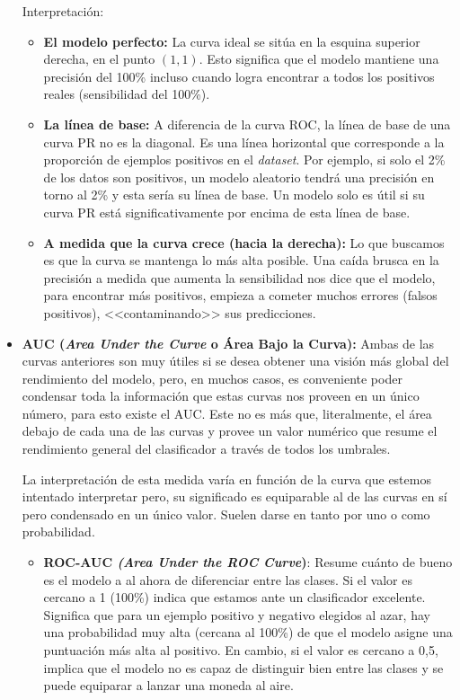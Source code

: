 \begin{itemize}
	Interpretación:
	
	\begin{itemize}
		\item \textbf{El modelo perfecto:} La curva ideal se sitúa en la esquina superior derecha, en el punto $(1, 1)$. Esto significa que el modelo mantiene una precisión del 100\% incluso cuando logra encontrar a todos los positivos reales (sensibilidad del 100\%).
		
		\item \textbf{La línea de base:} A diferencia de la curva ROC, la línea de base de una curva PR no es la diagonal. Es una línea horizontal que corresponde a la proporción de ejemplos positivos en el \textit{dataset}. Por ejemplo, si solo el 2\% de los datos son positivos, un modelo aleatorio tendrá una precisión en torno al 2\% y esta sería su línea de base. Un modelo solo es útil si su curva PR está significativamente por encima de esta línea de base.
		
		\item \textbf{A medida que la curva crece (hacia la derecha):} Lo que buscamos es que la curva se mantenga lo más alta posible. Una caída brusca en la precisión a medida que aumenta la sensibilidad nos dice que el modelo, para encontrar más positivos, empieza a cometer muchos errores (falsos positivos), <<contaminando>> sus predicciones.
	\end{itemize}
	
	\item \textbf{AUC (\textit{Area Under the Curve} o Área Bajo la Curva):} Ambas de las curvas anteriores son muy útiles si se desea obtener una visión más global del rendimiento del modelo, pero, en muchos casos, es conveniente poder condensar toda la información que estas curvas nos proveen en un único número, para esto existe el AUC. Este no es más que, literalmente, el área debajo de cada una de las curvas y provee un valor numérico que resume el rendimiento general del clasificador a través de todos los umbrales.
	
	La interpretación de esta medida varía en función de la curva que estemos intentado interpretar pero, su significado es equiparable al de las curvas en sí pero condensado en un único valor. Suelen darse en tanto por uno o como probabilidad.
	
	\begin{itemize}
		\item \textbf{ROC-AUC \textit{(Area Under the ROC Curve})}: Resume cuánto de bueno es el modelo a al ahora de diferenciar entre las clases. Si el valor es cercano a 1 (100\%) indica que estamos ante un clasificador excelente. Significa que para un ejemplo positivo y negativo elegidos al azar, hay una probabilidad muy alta (cercana al 100\%) de que el modelo asigne una puntuación más alta al positivo. En cambio, si el valor es cercano a 0,5, implica que el modelo no es capaz de distinguir bien entre las clases y se puede equiparar a lanzar una moneda al aire.
		

\end{itemize}
\end{itemize}
